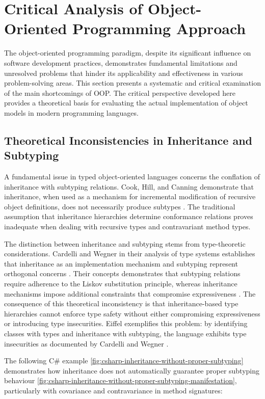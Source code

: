 \section{Critical Analysis of Object-Oriented Programming Approach}

The object-oriented programming paradigm, despite its significant influence on software development practices, demonstrates fundamental limitations and unresolved problems that hinder its applicability and effectiveness in various problem-solving areas. This section presents a systematic and critical examination of the main shortcomings of OOP. The critical perspective developed here provides a theoretical basis for evaluating the actual implementation of object models in modern programming languages.

\subsection{Theoretical Inconsistencies in Inheritance and Subtyping}

A fundamental issue in typed object-oriented languages concerns the conflation of inheritance with subtyping relations. Cook, Hill, and Canning demonstrate that inheritance, when used as a mechanism for incremental modification of recursive object definitions, does not necessarily produce subtypes \cite{cook1989inheritance}. The traditional assumption that inheritance hierarchies determine conformance relations proves inadequate when dealing with recursive types and contravariant method types. 

The distinction between inheritance and subtyping stems from type-theoretic considerations. Cardelli and Wegner in their analysis of type systems establishes that inheritance as an implementation mechanism and subtyping represent orthogonal concerns \cite{cardelli1985understanding}. Their concepts demonstrates that subtyping relations require adherence to the Liskov substitution principle, whereas inheritance mechanisms impose additional constraints that compromise expressiveness \cite{pierce1994simple}. The consequence of this theoretical inconsistency is that inheritance-based type hierarchies cannot enforce type safety without either compromising expressiveness or  introducing type insecurities. Eiffel exemplifies this problem: by identifying classes with types and inheritance with subtyping, the language exhibits type insecurities as documented by Cardelli and Wegner \cite{cardelli1985understanding}.

The following C\# example \ref{fig:csharp-inheritance-without-proper-subtyping} demonstrates how inheritance does not automatically guarantee proper subtyping behaviour \ref{fig:csharp-inheritance-without-proper-subtyping-manifestation}, particularly with covariance and contravariance in method signatures:

